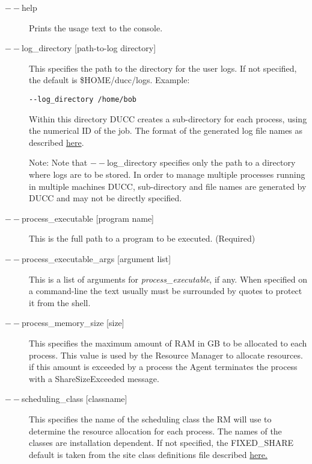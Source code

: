 \begin{description}
        \item[$--$help] Prints the usage text to the console.

        \item[$--$log\_directory {[path-to-log directory]} ]

          This specifies the path to the directory for the user logs. If not specified, the default
          is \$HOME/ducc/logs. Example: 
\begin{verbatim}
--log_directory /home/bob 
\end{verbatim}
          
          Within this directory DUCC creates a sub-directory for each process, using the numerical 
          ID of the job. The format of the generated log file names as described
          \hyperref[chap:job-logs]{here}.
          
          Note: Note that $--$log\_directory specifies only the path to a directory where 
          logs are to be stored. In order to manage multiple processes running in multiple 
          machines DUCC, sub-directory and file names are generated by DUCC and may 
          not be directly specified. 

        \item[$--$process\_executable {[program name]}] This is the full path to a program to be
          executed. (Required)

        \item[$--$process\_executable\_args {[argument list]}] This is a list of arguments for
          {\em process\_executable}, if any.   When specified on a command-line the text usually must be
          surrounded by quotes to protect it from the shell.

        \item[$--$process\_memory\_size {[size]} ] This specifies the maximum amount of RAM in GB to
          be allocated to each process.  This value is used by the Resource Manager to allocate
          resources. if this amount is exceeded by a process the Agent terminates the process with a
          ShareSizeExceeded message.

        \item[$--$scheduling\_class {[classname]} ] This specifies the name of the scheduling class the
          RM will use to determine the resource allocation for each process. The names of the
          classes are installation dependent.
          If not specified, the FIXED\_SHARE default is taken from the site class definitions file
          described \hyperref[subsubsec:class.configuration]{here.} 


\end{description}
